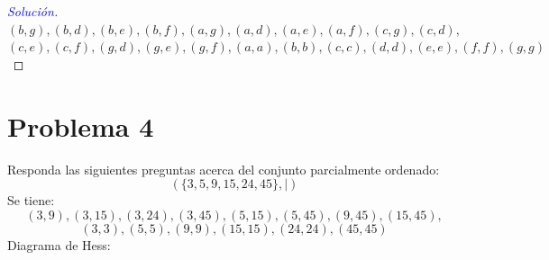 \documentclass[a4paper,12pt]{article}
\newenvironment{solution}
  {\renewcommand\qedsymbol{$\square$}\begin{proof}[\textcolor{blue}{Solución}]}
  {\end{proof}}
\begin{document}
\begin{enumerate}
\begin{center}
    \end{center}
    \begin{solution}
    $(b,g), (b,d), (b,e), (b,f), (a,g), (a,d),(a,e),(a,f), (c,g), (c,d),$\\$ (c,e), (c,f), (g,d),(g,e),(g,f), (a,a), (b,b), (c,c),(d,d), (e,e), (f,f), (g,g)$
    \end{solution}
\end{enumerate}

\section{Problema 4}

Responda las siguientes preguntas acerca del conjunto parcialmente ordenado:
$$(\{3,5,9,15,24,45\}, |)$$
Se tiene: 
$$(3,9), (3,15), (3,24), (3,45), (5, 15), (5, 45), (9,45), (15, 45), $$
$$(3,3),(5,5),(9,9),(15,15),(24,24),(45,45)$$
Diagrama de Hess: 
\end{document}
